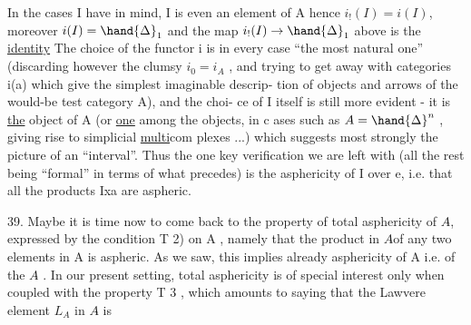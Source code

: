 In the cases I have in mind, I is even an element of A hence
$i_!(I)=i(I)$, moreover $i(I)=\hand{\Delta}_1$ and the map $i_!(I)\to\hand{\Delta}_1$ above is the
\uline{identity} The choice of the functor i is in every case ``the most natural
one'' (discarding however the clumsy $i_0=i_A$ , and trying to get away
with categories i(a) which  give the simplest imaginable descrip-%
tion of objects and arrows of the would-be test category A), and the choi-%
ce of I itself is still more evident - it is \uline{the} object of A (or \uline{one} among
the objects, in c ases such as $A=\hand{\Delta}^n$ , giving rise to simplicial \uline{multi}com
plexes ...) which suggests most strongly the picture of an ``interval''. Thus
\margin{\unsure{$\updownarrow$}}the one key verification we are left with (all the rest being ``formal'' in
terms of what precedes) is the asphericity of I over e, i.e. that all
the products Ixa are aspheric.

\margin{\unsure{$\updownarrow$}}39. Maybe it is time now to come back to the property of total asphericity
of $A\hat{}$, expressed by the condition T 2) on A , namely that the product in
$A\hat{}$of any two elements in A is aspheric. As we saw,  this implies already
asphericity of A i.e. of  the  $A\hat{}$ . In our present setting, total
asphericity is of special interest only when coupled with the property
T 3 , which amounts to saying that the Lawvere element $L_A$ in $A\hat{}$ is
